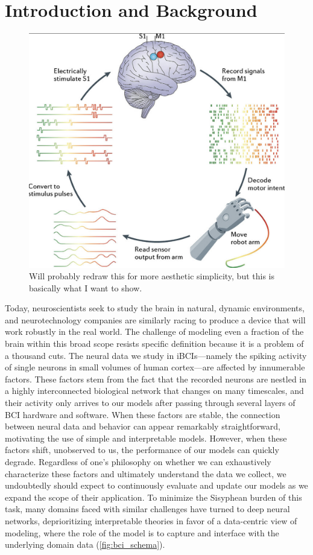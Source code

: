 \documentclass[12pt,oneside]{report}
\begin{document}
\tableofcontents

\cleardoublepage
{}

\chapter{Introduction and Background}

\begin{figure}[h]
  \centering
  \includegraphics[width=0.5\linewidth]{ch1_bci_loop.png}
  \caption{Will probably redraw this for more aesthetic simplicity, but this is basically what I want to show.}
  \label{fig:bci_loop}
\end{figure}

Today, neuroscientists seek to study the brain in natural, dynamic environments, and neurotechnology companies are similarly racing to produce a device that will work robustly in the real world. The challenge of modeling even a fraction of the brain within this broad scope resists specific definition because it is a problem of a thousand cuts. The neural data we study in iBCIs---namely the spiking activity of single neurons in small volumes of human cortex---are affected by innumerable factors. These factors stem from the fact that the recorded neurons are nestled in a highly interconnected biological network that changes on many timescales, and their activity only arrives to our models after passing through several layers of BCI hardware and software. When these factors are stable, the connection between neural data and behavior can appear remarkably straightforward, motivating the use of simple and interpretable models. However, when these factors shift, unobserved to us, the performance of our models can quickly degrade. Regardless of one’s philosophy on whether we can exhaustively characterize these factors and ultimately understand the data we collect, we undoubtedly should expect to continuously evaluate and update our models as we expand the scope of their application. To minimize the Sisyphean burden of this task, many domains faced with similar challenges have turned to deep neural networks, deprioritizing interpretable theories in favor of a data-centric view of modeling, where the role of the model is to capture and interface with the underlying domain data (\cref{fig:bci_schema}).
\end{document}
